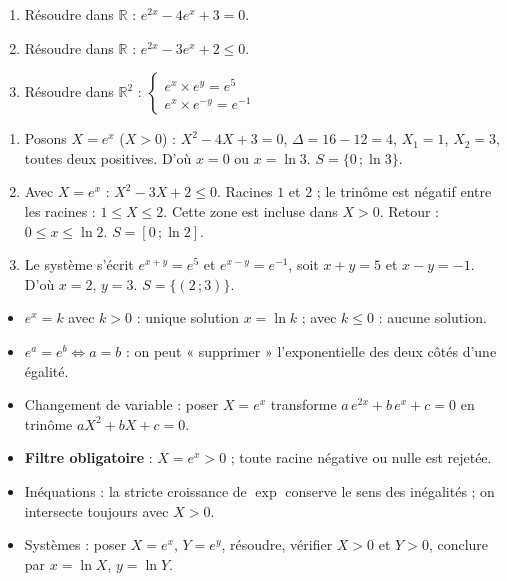 \documentclass[11pt]{article}
\begin{document}
\begin{exercice}
\begin{enumerate}
\item Résoudre dans $\mathbb{R}$ : $e^{2x} - 4e^x + 3 = 0$.
\item Résoudre dans $\mathbb{R}$ : $e^{2x} - 3e^x + 2 \leq 0$.
\item Résoudre dans $\mathbb{R}^2$ : $\begin{cases} e^x \times e^y = e^5 \\ e^x \times e^{-y} = e^{-1} \end{cases}$
\end{enumerate}
\end{exercice}

\begin{corrige}[Exercice]
\begin{enumerate}
\item Posons $X = e^x$ ($X > 0$) : $X^2 - 4X + 3 = 0$, $\Delta = 16 - 12 = 4$, $X_1 = 1$, $X_2 = 3$, toutes deux positives. D'où $x = 0$ ou $x = \ln 3$. $S = \{0\,; \ln 3\}$.
\item Avec $X = e^x$ : $X^2 - 3X + 2 \leq 0$. Racines $1$ et $2$ ; le trinôme est négatif entre les racines : $1 \leq X \leq 2$. Cette zone est incluse dans $X > 0$. Retour : $0 \leq x \leq \ln 2$. $S = [0\,; \ln 2]$.
\item Le système s'écrit $e^{x+y} = e^5$ et $e^{x-y} = e^{-1}$, soit $x + y = 5$ et $x - y = -1$. D'où $x = 2$, $y = 3$. $S = \{(2\,; 3)\}$.
\end{enumerate}
\end{corrige}

\begin{aretenir}
\begin{itemize}
\item $e^x = k$ avec $k > 0$ : unique solution $x = \ln k$ ; avec $k \leq 0$ : aucune solution.
\item $e^a = e^b \Leftrightarrow a = b$ : on peut « supprimer » l'exponentielle des deux côtés d'une égalité.
\item Changement de variable : poser $X = e^x$ transforme $a\,e^{2x} + b\,e^x + c = 0$ en trinôme $aX^2 + bX + c = 0$.
\item \textbf{Filtre obligatoire} : $X = e^x > 0$ ; toute racine négative ou nulle est rejetée.
\item Inéquations : la stricte croissance de $\exp$ conserve le sens des inégalités ; on intersecte toujours avec $X > 0$.
\item Systèmes : poser $X = e^x$, $Y = e^y$, résoudre, vérifier $X > 0$ et $Y > 0$, conclure par $x = \ln X$, $y = \ln Y$.
\end{itemize}
\end{aretenir}
\end{document}
